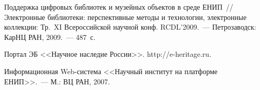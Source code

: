 \begin{multicols}{2}
{{\begin{thebibliography}{99}
Поддержка цифровых библиотек и музейных объектов в среде ЕНИП~// Электронные 
библиотеки: перспективные методы и технологии, электронные коллекции: Тр.\ XI 
Всероссийской научной конф. RCDL'2009.~--- Петрозаводск: КарНЦ РАН, 2009.~--- 487~с.

Портал ЭБ <<Научное наследие России>>. {\sf http://\linebreak e-heritage.ru}.

 \label{end\stat}

Информационная Web-система <<Научный институт на платформе ЕНИП>>.~--- М.: ВЦ 
РАН, 2007.
 \end{thebibliography}
}
}


\end{multicols}